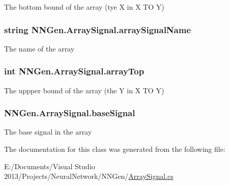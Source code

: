 The bottom bound of the array (tye X in X T\+O Y) 

\hypertarget{class_n_n_gen_1_1_array_signal_aab7a2cc15c50394e6f6a6085ce467762}{}
\subsubsection[{array\+Signal\+Name}]{\setlength{\rightskip}{0pt plus 5cm}string N\+N\+Gen.\+Array\+Signal.\+array\+Signal\+Name\hspace{0.3cm}{\ttfamily [get]}}\label{class_n_n_gen_1_1_array_signal_aab7a2cc15c50394e6f6a6085ce467762}


The name of the array 

\hypertarget{class_n_n_gen_1_1_array_signal_ae5f4cbd20b0ff287422320175a949037}{}
\subsubsection[{array\+Top}]{\setlength{\rightskip}{0pt plus 5cm}int N\+N\+Gen.\+Array\+Signal.\+array\+Top\hspace{0.3cm}{\ttfamily [get]}}\label{class_n_n_gen_1_1_array_signal_ae5f4cbd20b0ff287422320175a949037}


The uppper bound of the array (the Y in X T\+O Y) 

\hypertarget{class_n_n_gen_1_1_array_signal_ac02aec9002f01b76184bf49356e73671}{}
\subsubsection[{base\+Signal}]{ N\+N\+Gen.\+Array\+Signal.\+base\+Signal\hspace{0.3cm}{\ttfamily [get]}}\label{class_n_n_gen_1_1_array_signal_ac02aec9002f01b76184bf49356e73671}


The base signal in the array 



The documentation for this class was generated from the following file\+:\begin{DoxyCompactItemize}
\item 
E\+:/\+Documents/\+Visual Studio 2013/\+Projects/\+Neural\+Network/\+N\+N\+Gen/\hyperlink{_array_signal_8cs}{Array\+Signal.\+cs}\end{DoxyCompactItemize}
